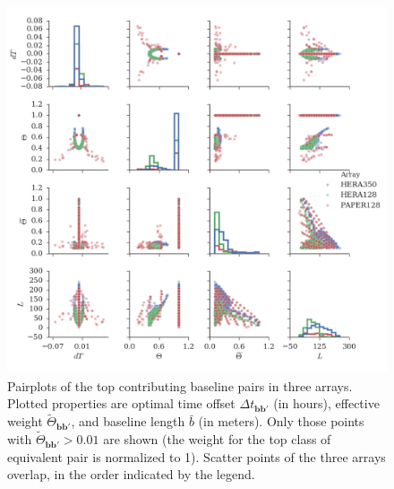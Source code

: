 \documentclass[twocolumn,apj,numberedappendix]{emulateapj}
\renewcommand\[{\begin{equation}}
\renewcommand\]{\end{equation}}
\begin{document}
\begin{figure}[H]
\includegraphics[width=\linewidth]{pairplot}

\caption{Pairplots of the top contributing baseline pairs in three arrays. Plotted properties are optimal time offset $\Delta t_{\boldsymbol{bb'}}$ (in hours),  effective weight $\widetilde{\Theta}_{\boldsymbol{bb'}}$, and baseline length $\bar{b}$ (in meters). Only those points with $\widetilde{\Theta}_{\boldsymbol{bb'}}>0.01$ are shown (the weight for the top class of equivalent pair is normalized to 1). Scatter points of the three arrays overlap, in the order indicated by the legend. }
\label{fig:pairplot}
\end{figure}
\end{document}
